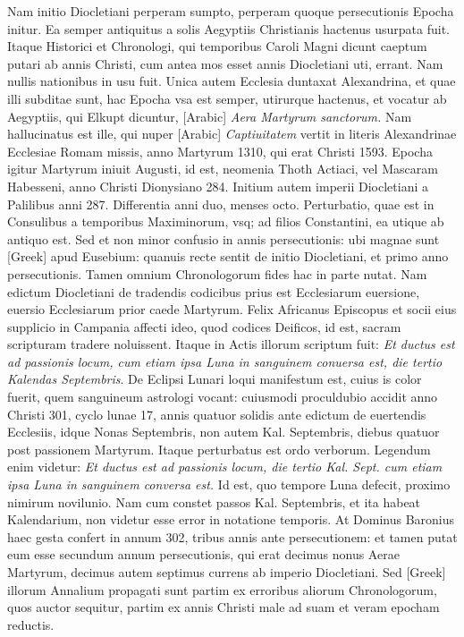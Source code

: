 Nam initio Diocletiani perperam sumpto, perperam quoque
persecutionis Epocha initur.
Ea semper antiquitus a solis Aegyptiis
Christianis hactenus usurpata fuit.
Itaque Historici et Chronologi,
qui temporibus Caroli Magni dicunt caeptum putari ab annis
Christi, cum antea mos esset annis Diocletiani uti, errant.
Nam
nullis nationibus in usu fuit.
Unica autem Ecclesia duntaxat Alexandrina,
et quae illi subditae sunt, hac Epocha vsa est semper, utirurque
hactenus, et vocatur ab Aegyptiis, qui Elkupt dicuntur,
\textarabic{[Arabic]} \textit{Aera Martyrum sanctorum.}
Nam
hallucinatus est ille, qui nuper \textarabic{[Arabic]}
\textit{Captiuitatem} vertit in literis
Alexandrinae Ecclesiae Romam missis, anno Martyrum 1310, qui
erat Christi 1593.
Epocha igitur Martyrum iniuit  Augusti,
id est, neomenia Thoth Actiaci, vel Mascaram Habesseni, anno Christi
Dionysiano 284.
Initium autem imperii Diocletiani a Palilibus
anni 287.
Differentia anni duo, menses octo.
Perturbatio, quae est in
Consulibus a temporibus Maximinorum, vsq; ad filios Constantini,
ea utique ab antiquo est.
Sed et non minor confusio in annis persecutionis:
ubi magnae sunt \textgreek{[Greek]} apud Eusebium: quanuis
recte sentit de initio Diocletiani, et primo anno persecutionis.
Tamen
omnium Chronologorum fides hac in parte nutat.
Nam edictum
Diocletiani de tradendis codicibus prius est Ecclesiarum euersione,
euersio Ecclesiarum prior caede Martyrum.
Felix Africanus Episcopus
et socii eius supplicio in Campania affecti ideo, quod codices
Deificos, id est, sacram scripturam tradere noluissent.
Itaque in
Actis illorum scriptum fuit: \textit{Et ductus est ad passionis locum, cum etiam
ipsa Luna in sanguinem conuersa est, die tertio Kalendas Septembris}.
De Eclipsi
Lunari loqui manifestum est, cuius is color fuerit, quem sanguineum
astrologi vocant: cuiusmodi proculdubio accidit anno Christi
301, cyclo lunae 17, annis quatuor solidis ante edictum de euertendis
Ecclesiis, idque  Nonas Septembris, non autem  Kal.
Septembris, diebus quatuor post passionem Martyrum.
Itaque perturbatus
est ordo verborum.
Legendum enim videtur: \textit{Et ductus est ad passionis
locum, die tertio Kal. Sept. cum etiam ipsa Luna in sanguinem conversa
est.}
Id est, quo tempore Luna defecit, proximo nimirum novilunio.
Nam cum constet passos  Kal. Septembris, et ita habeat
Kalendarium, non videtur esse error in notatione temporis.
At Dominus Baronius haec gesta confert in annum 302, tribus annis ante
persecutionem: et tamen putat eum esse secundum annum persecutionis,
qui erat decimus nonus Aerae Martyrum, decimus autem
septimus currens ab imperio Diocletiani.
Sed \textgreek{[Greek]} illorum
Annalium propagati sunt partim ex erroribus aliorum Chronologorum,
quos auctor sequitur, partim ex annis Christi male ad
suam et veram epocham reductis.

